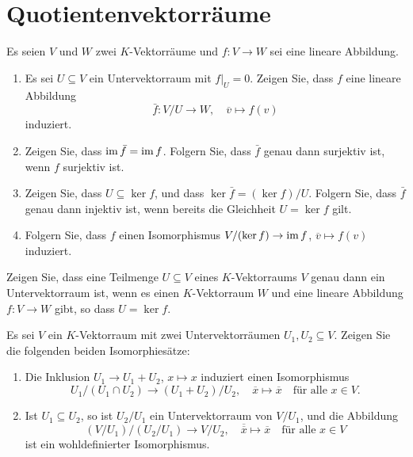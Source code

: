\section{Quotientenvektorräume}







\begin{question}[subtitle = Die universelle Eigenschaft des Quotienten]{1}
  Es seien $V$ und $W$ zwei $K$-Vektorräume und $f \colon V \to W$ sei eine lineare Abbildung.
  \begin{enumerate}[leftmargin=*]
    \item
      Es sei $U \subseteq V$ ein Untervektorraum mit $f|_U = 0$.
      Zeigen Sie, dass $f$ eine lineare Abbildung
      \[
        \bar{f} \colon V\!/U \to W,
        \quad
        \overline{v} \mapsto f(v)
      \]
      induziert.
    \item
      Zeigen Sie, dass $\operatorname{im} \bar{f} = \operatorname{im} f$.
      Folgern Sie, dass $\bar{f}$ genau dann surjektiv ist, wenn $f$ surjektiv ist.
    \item
      Zeigen Sie, dass $U \subseteq \ker f$, und dass $\ker \bar{f} = (\ker f)/U$.
      Folgern Sie, dass $\bar{f}$ genau dann injektiv ist, wenn bereits die Gleichheit $U = \ker f$ gilt.
    \item
      Folgern Sie, dass $f$ einen Isomorphismus $V/(\ker f) \to \operatorname{im} f$, $\overline{v} \mapsto f(v)$ induziert.
  \end{enumerate}
\end{question}


\begin{question}[subtitle = Charakterisierung von Untervektorräumen]{1}
  Zeigen Sie, dass eine Teilmenge $U \subseteq V$ eines $K$-Vektorraums $V$ genau dann ein Untervektorraum ist, wenn es einen $K$-Vektorraum $W$ und eine lineare Abbildung $f \colon V \to W$ gibt, so dass $U = \ker f$.
\end{question}


\begin{question}[subtitle = Isomorphiesätze]{1}
  Es sei $V$ ein $K$-Vektorraum mit zwei Untervektorräumen $U_1, U_2 \subseteq V$.
  Zeigen Sie die folgenden beiden Isomorphiesätze:
  \begin{enumerate}[leftmargin=*]
    \item
      Die Inklusion $U_1 \to U_1 + U_2$, $x \mapsto x$ induziert einen Isomorphismus
      \[
        U_1 / (U_1 \cap U_2) \to (U_1 + U_2) / U_2,
        \quad
        \overline{x} \mapsto \overline{x}
        \quad
        \text{für alle $x \in V$}.
      \]
    \item
      Ist $U_1 \subseteq U_2$, so ist $U_2 / U_1$ ein Untervektorraum von $V / U_1$, und die Abbildung
      \[
        (V \! / U_1) / (U_2 / U_1) \to V \! / U_2,
        \quad
        \overline{\overline{x}} \mapsto \overline{x}
        \quad
        \text{für alle $x \in V$}
      \]
      ist ein wohldefinierter Isomorphismus.
  \end{enumerate}
\end{question}





